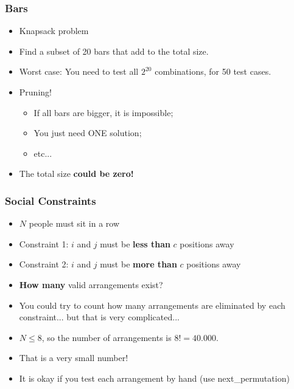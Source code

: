 \begin{frame}
  \frametitle{Bars}

  {\small
  \begin{block}{}
    \begin{itemize}
    \item Knapsack problem
    \item Find a subset of 20 bars that add to the total size.
    \end{itemize}
  \end{block}

  \begin{itemize}
  \item Worst case: You need to test all $2^{20}$ combinations, for 50 test cases.
  \item Pruning!
    \begin{itemize}
    \item If all bars are bigger, it is impossible;
    \item You just need ONE solution;
    \item etc...
    \end{itemize}
  \item The total size {\bf could be zero!}
  \end{itemize}
  
  }
\end{frame}

\begin{frame}
  \frametitle{Social Constraints}

  {\small
    \begin{block}{}
      \begin{itemize}
      \item $N$ people must sit in a row
      \item Constraint 1: $i$ and $j$ must be {\bf less than} $c$ positions away
      \item Constraint 2: $i$ and $j$ must be {\bf more than} $c$ positions away
      \item {\bf How many} valid arrangements exist?
      \end{itemize}
    \end{block}

    \begin{itemize}
    \item You could try to count how many arrangements are eliminated
      by each constraint... \alert{but that is very complicated...}
    \item $N \leq 8$, so the number of arrangements is $8! = 40.000$.
    \item That is a very small number!
    \item It is okay if you test each arrangement by hand (use next\_permutation)
    \end{itemize}
  }
\end{frame}

